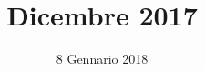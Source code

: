 


\title{ Dicembre 2017}
\author{\GroupName}

\date{8 Gennario 2018}



\makeFrontPage

    \frenchspacing

    


